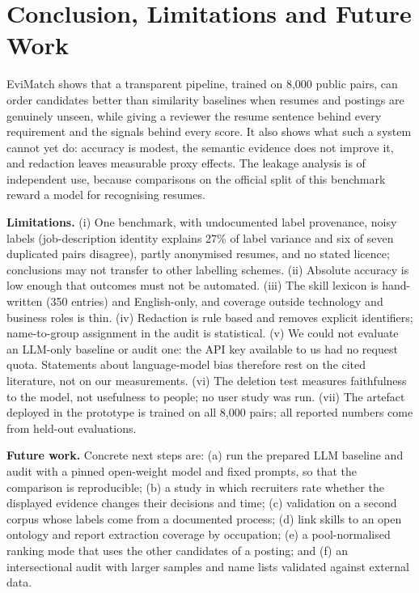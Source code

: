 \section{Conclusion, Limitations and Future Work}\label{sec:conclusion}
EviMatch shows that a transparent pipeline, trained on 8{,}000 public pairs, can order candidates better
than similarity baselines when resumes and postings are genuinely unseen, while giving a reviewer the resume
sentence behind every requirement and the signals behind every score. It also shows what such a system
cannot yet do: accuracy is modest, the semantic evidence does not improve it, and redaction leaves
measurable proxy effects. The leakage analysis is of independent use, because comparisons on the official
split of this benchmark reward a model for recognising resumes.

\textbf{Limitations.}
(i) One benchmark, with undocumented label provenance, noisy labels (job-description identity explains
27\% of label variance and six of seven duplicated pairs disagree), partly anonymised resumes, and no stated
licence; conclusions may not transfer to other labelling schemes.
(ii) Absolute accuracy is low enough that outcomes must not be automated.
(iii) The skill lexicon is hand-written (350 entries) and English-only, and coverage outside technology and
business roles is thin.
(iv) Redaction is rule based and removes explicit identifiers; name-to-group assignment in the audit is
statistical.
(v) We could not evaluate an LLM-only baseline or audit one: the API key available to us had no request
quota. Statements about language-model bias therefore rest on the cited literature, not on our measurements.
(vi) The deletion test measures faithfulness to the model, not usefulness to people; no user study was run.
(vii) The artefact deployed in the prototype is trained on all 8{,}000 pairs; all reported numbers come from
held-out evaluations.

\textbf{Future work.} Concrete next steps are: (a) run the prepared LLM baseline and audit with a pinned
open-weight model and fixed prompts, so that the comparison is reproducible; (b) a study in which recruiters rate
whether the displayed evidence changes their decisions and time; (c) validation on a second corpus whose labels
come from a documented process; (d) link skills to an open ontology and report extraction coverage by
occupation; (e) a pool-normalised ranking mode that uses the other candidates of a posting; and (f) an
intersectional audit with larger samples and name lists validated against external data.

